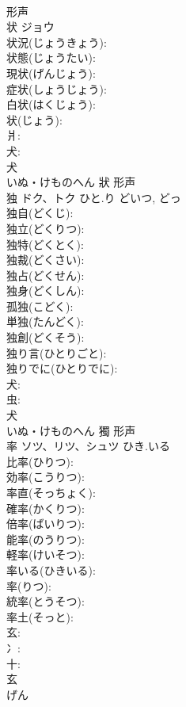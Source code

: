 \documentclass[8pt]{extreport}
\begin{document}
\begin{CJK}{UTF8}{min}
\\	形声 
\\	状	ジョウ			
\\	状況(じょうきょう): 
\\	状態(じょうたい): 
\\	現状(げんじょう): 
\\	症状(しょうじょう): 
\\	白状(はくじょう): 
\\	状(じょう): 
\\	爿: 
\\	犬: 
\\	犬	
\\	いぬ・けものへん	狀	形声 
\\	独	ドク、トク	ひと.り	どいつ, どっ	
\\	独自(どくじ): 
\\	独立(どくりつ): 
\\	独特(どくとく): 
\\	独裁(どくさい): 
\\	独占(どくせん): 
\\	独身(どくしん): 
\\	孤独(こどく): 
\\	単独(たんどく): 
\\	独創(どくそう): 
\\	独り言(ひとりごと): 
\\	独りでに(ひとりでに): 
\\	犬: 
\\	虫: 
\\	犬	
\\	いぬ・けものへん	獨	形声 
\\	率	ソツ、リツ、シュツ	ひき.いる		
\\	比率(ひりつ): 
\\	効率(こうりつ): 
\\	率直(そっちょく): 
\\	確率(かくりつ): 
\\	倍率(ばいりつ): 
\\	能率(のうりつ): 
\\	軽率(けいそつ): 
\\	率いる(ひきいる): 
\\	率(りつ): 
\\	統率(とうそつ): 
\\	率土(そっと): 
\\	玄: 
\\	冫: 
\\	十: 
\\	玄	
\\	げん	

\end{CJK}
\end{document}
